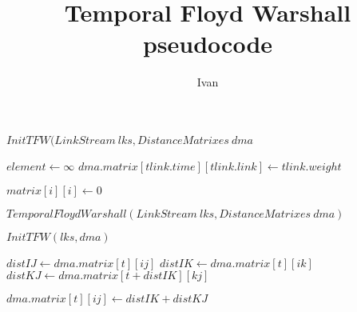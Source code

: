 \documentclass[12pt]{article}
\title{Temporal Floyd Warshall pseudocode}
\author{Ivan}
\begin{document}
\centerline{$InitTFW(LinkStream \ lks, DistanceMatrixes \ dma$}
\begin{algorithmic}
			\State $element \gets \infty$
		\EndFor
	\EndFor
		\State $dma.matrix[tlink.time][tlink.link] \gets tlink.weight$ 
	\EndFor

			\State $matrix[i][i] \gets 0$
		\EndFor
	\EndFor
\end{algorithmic}

\hfill \break
\hfill \break 

\centerline{$TemporalFloydWarshall(LinkStream \ lks, DistanceMatrixes \ dma)$}
\begin{algorithmic}
	\State $InitTFW(lks, dma)$

				
					\State $distIJ \gets dma.matrix[t][ij]$
					\State $distIK \gets dma.matrix[t][ik]$
					\State $distKJ \gets dma.matrix[t+distIK][kj]$

						\State $dma.matrix[t][ij] \gets distIK + distKJ$
					\EndIf
				\EndFor
			\EndFor
		\EndFor
		

	\EndFor 

\end{algorithmic}
\end{document}
